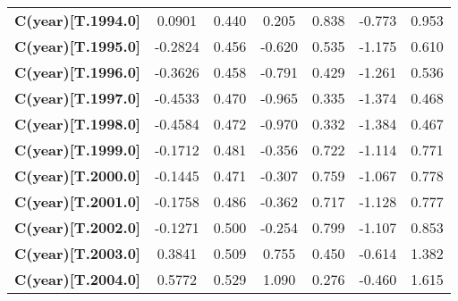 \begin{center}
\begin{tabular}{lcccccc}
\textbf{C(year)[T.1994.0]}                                                                          &       0.0901  &        0.440     &     0.205  &         0.838        &       -0.773    &        0.953     \\
\textbf{C(year)[T.1995.0]}                                                                          &      -0.2824  &        0.456     &    -0.620  &         0.535        &       -1.175    &        0.610     \\
\textbf{C(year)[T.1996.0]}                                                                          &      -0.3626  &        0.458     &    -0.791  &         0.429        &       -1.261    &        0.536     \\
\textbf{C(year)[T.1997.0]}                                                                          &      -0.4533  &        0.470     &    -0.965  &         0.335        &       -1.374    &        0.468     \\
\textbf{C(year)[T.1998.0]}                                                                          &      -0.4584  &        0.472     &    -0.970  &         0.332        &       -1.384    &        0.467     \\
\textbf{C(year)[T.1999.0]}                                                                          &      -0.1712  &        0.481     &    -0.356  &         0.722        &       -1.114    &        0.771     \\
\textbf{C(year)[T.2000.0]}                                                                          &      -0.1445  &        0.471     &    -0.307  &         0.759        &       -1.067    &        0.778     \\
\textbf{C(year)[T.2001.0]}                                                                          &      -0.1758  &        0.486     &    -0.362  &         0.717        &       -1.128    &        0.777     \\
\textbf{C(year)[T.2002.0]}                                                                          &      -0.1271  &        0.500     &    -0.254  &         0.799        &       -1.107    &        0.853     \\
\textbf{C(year)[T.2003.0]}                                                                          &       0.3841  &        0.509     &     0.755  &         0.450        &       -0.614    &        1.382     \\
\textbf{C(year)[T.2004.0]}                                                                          &       0.5772  &        0.529     &     1.090  &         0.276        &       -0.460    &        1.615     \\

\end{tabular}
\end{center}

